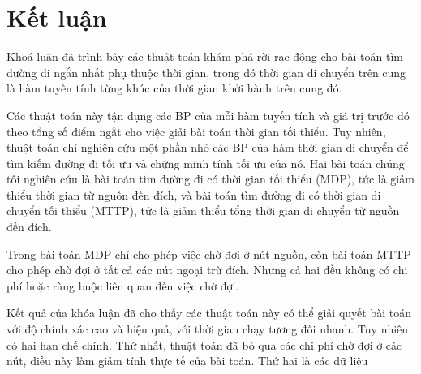 \documentclass[../main.tex]{subfiles}
\begin{document}
\chapter{Kết luận}\label{kux1ebft-luux1eadn}

Khoá luận đã trình bày các thuật toán khám phá rời rạc động cho bài toán tìm đường đi ngắn nhất phụ thuộc thời gian, trong đó thời gian di chuyển trên cung là hàm tuyến tính từng khúc của thời gian khởi hành trên cung đó. 

Các thuật toán này tận dụng các BP của mỗi hàm tuyến tính và giá trị trước đó theo tổng số điểm ngắt cho việc giải bài toán thời gian tối thiểu. Tuy nhiên, thuật toán chỉ nghiên cứu một phần nhỏ các BP của hàm thời gian di chuyển để tìm kiếm đường đi tối ưu và chứng minh tính tối ưu của nó. Hai bài toán chúng tôi nghiên cứu là bài toán tìm đường đi có thời gian tối thiểu (MDP), tức là giảm thiểu thời gian từ nguồn đến đích, và bài toán tìm đường đi có thời gian di chuyển tối thiểu (MTTP), tức là giảm thiểu tổng thời gian di chuyển từ nguồn đến đích. 

Trong bài toán MDP chỉ cho phép việc chờ đợi ở nút nguồn, còn bài toán MTTP cho phép chờ đợi ở tất cả các nút ngoại trừ đích. Nhưng cả hai đều không có chi phí hoặc ràng buộc liên quan đến việc chờ đợi. 

Kết quả của khóa luận đã cho thấy các thuật toán này có thể giải quyết bài toán với độ chính xác cao và hiệu quả, với thời gian chạy tương đối nhanh. Tuy nhiên có hai hạn chế chính. Thứ nhất, thuật toán đã bỏ qua các chi phí chờ đợi ở các nút, điều này làm giảm tính thực tế của bài toán. Thứ hai là các dữ liệu 

\end{document}
